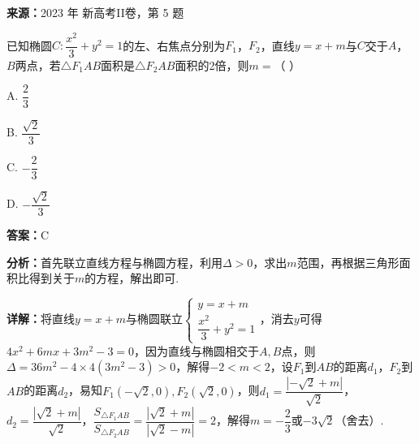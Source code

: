 \begin{question}[points=5]
\textbf{来源：}2023 年 新高考II卷，第 5 题\par
已知椭圆$C:\dfrac{x^{2}}{3}+y^{2}=1$的左、右焦点分别为$F_{1}$，$F_{2}$，直线$y=x+m$与$C$交于$A$，$B$两点，若$\triangle F_{1}AB$面积是$\triangle F_{2}AB$面积的2倍，则$m=$（ \quad ）
\begin{choices}
  \item A. $\dfrac{2}{3}$
  \item B. $\dfrac{\sqrt{2}}{3}$
  \item C. $-\dfrac{2}{3}$
  \item D. $-\dfrac{\sqrt{2}}{3}$
\end{choices}
\begin{solution}
\textbf{答案：}C

\textbf{分析：}首先联立直线方程与椭圆方程，利用$\Delta>0$，求出$m$范围，再根据三角形面积比得到关于$m$的方程，解出即可.

\textbf{详解：}将直线$y=x+m$与椭圆联立$\begin{cases}y=x+m\\ \dfrac{x^{2}}{3}+y^{2}=1\end{cases}$，消去$y$可得$4x^{2}+6mx+3m^{2}-3=0$，因为直线与椭圆相交于$A,B$点，则$\Delta=36m^{2}-4\times4(3m^{2}-3)>0$，解得$-2<m<2$，设$F_{1}$到$AB$的距离$d_{1}$，$F_{2}$到$AB$的距离$d_{2}$，易知$F_{1}(-\sqrt{2},0),F_{2}(\sqrt{2},0)$，则$d_{1}=\dfrac{|-\sqrt{2}+m|}{\sqrt{2}}$，$d_{2}=\dfrac{|\sqrt{2}+m|}{\sqrt{2}}$，$\dfrac{S_{\triangle F_{1}AB}}{S_{\triangle F_{2}AB}}=\dfrac{|\sqrt{2}+m|}{|\sqrt{2}-m|}=2$，解得$m=-\dfrac{2}{3}$或$-3\sqrt{2}$（舍去）.
\end{solution}
\end{question}

